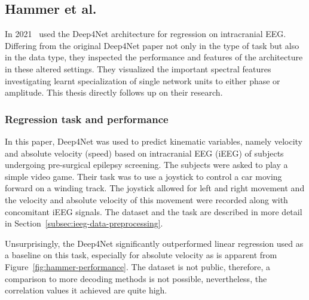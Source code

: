 \subsection{Hammer et al.}\label{subsec:hammer-et-al}
In 2021~\cite{Hammer-2021} used the Deep4Net architecture for regression on intracranial EEG.
Differing from the original Deep4Net paper not only in the type of task but also in the data type, they inspected the performance and features of the architecture in these altered settings.
They visualized the important spectral features investigating learnt specialization of single network units to either phase or amplitude.
This thesis directly follows up on their research.

\subsubsection{Regression task and performance}
In this paper, Deep4Net was used to predict kinematic variables, namely velocity and absolute velocity (speed) based on intracranial EEG (iEEG) of subjects undergoing pre-surgical epilepsy screening.
The subjects were asked to play a simple video game.
Their task was to use a joystick to control a car moving forward on a winding track.
The joystick allowed for left and right movement and the velocity and absolute velocity of this movement were recorded along with concomitant iEEG signals. 
The dataset and the task are described in more detail in Section~\ref{subsec:ieeg-data-preprocessing}.

Unsurprisingly, the Deep4Net significantly outperformed linear regression used as a baseline on this task, especially for absolute velocity as is apparent from Figure~\ref{fig:hammer-performance}.
The dataset is not public, therefore, a comparison to more decoding methods is not possible, nevertheless, the correlation values it achieved are quite high.

